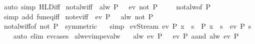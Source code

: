 \begin{isabellebody}
\isatagproof
{}\isamarkupfalse%
\ {\isacharparenleft}auto\ simp{\isacharcolon}\ HLD{\isacharunderscore}iff{\isacharparenright}%
\endisatagproof
{\isafoldproof}%
%
\isadelimproof
\isanewline
%
\endisadelimproof
\isanewline
{}\isamarkupfalse%
\ not{\isacharunderscore}alw{\isacharunderscore}iff{\isacharcolon}\ {\isachardoublequoteopen}{\isasymnot}\ {\isacharparenleft}alw\ P\ {\isasymomega}{\isacharparenright}\ {\isasymlongleftrightarrow}\ ev\ {\isacharparenleft}not\ P{\isacharparenright}\ {\isasymomega}{\isachardoublequoteclose}\isanewline
%
\isadelimproof
\ \ %
\endisadelimproof
%
\isatagproof
{}\isamarkupfalse%
\ not{\isacharunderscore}alw{\isacharbrackleft}of\ P{\isacharbrackright}\ \isamarkupfalse%
\ {\isacharparenleft}simp\ add{\isacharcolon}\ fun{\isacharunderscore}eq{\isacharunderscore}iff{\isacharparenright}%
\endisatagproof
{\isafoldproof}%
%
\isadelimproof
\isanewline
%
\endisadelimproof
\isanewline
{}\isamarkupfalse%
\ not{\isacharunderscore}ev{\isacharunderscore}iff{\isacharcolon}\ {\isachardoublequoteopen}{\isasymnot}\ {\isacharparenleft}ev\ P\ {\isasymomega}{\isacharparenright}\ {\isasymlongleftrightarrow}\ alw\ {\isacharparenleft}not\ P{\isacharparenright}\ {\isasymomega}{\isachardoublequoteclose}\isanewline
%
\isadelimproof
\ \ %
\endisadelimproof
%
\isatagproof
{}\isamarkupfalse%
\ not{\isacharunderscore}alw{\isacharunderscore}iff{\isacharbrackleft}of\ {\isachardoublequoteopen}not\ P{\isachardoublequoteclose}\ {\isasymomega}{\isacharcomma}\ symmetric{\isacharbrackright}\ \ \isamarkupfalse%
\ simp%
\endisatagproof
{\isafoldproof}%
%
\isadelimproof
\isanewline
%
\endisadelimproof
\isanewline
{}\isamarkupfalse%
\ ev{\isacharunderscore}Stream{\isacharcolon}\ {\isachardoublequoteopen}ev\ P\ {\isacharparenleft}x\ {\isacharhash}{\isacharhash}\ s{\isacharparenright}\ {\isasymlongleftrightarrow}\ P\ {\isacharparenleft}x\ {\isacharhash}{\isacharhash}\ s{\isacharparenright}\ {\isasymor}\ ev\ P\ s{\isachardoublequoteclose}\isanewline
%
\isadelimproof
\ \ %
\endisadelimproof
%
\isatagproof
{}\isamarkupfalse%
\ {\isacharparenleft}auto\ elim{\isacharcolon}\ ev{\isachardot}cases{\isacharparenright}%
\endisatagproof
{\isafoldproof}%
%
\isadelimproof
\isanewline
%
\endisadelimproof
\isanewline
{}\isamarkupfalse%
\ alw{\isacharunderscore}ev{\isacharunderscore}imp{\isacharunderscore}ev{\isacharunderscore}alw{\isacharcolon}\isanewline
\ \ \ {\isachardoublequoteopen}alw\ {\isacharparenleft}ev\ P{\isacharparenright}\ {\isasymomega}{\isachardoublequoteclose}\ \ {\isachardoublequoteopen}ev\ {\isacharparenleft}P\ aand\ alw\ {\isacharparenleft}ev\ P{\isacharparenright}{\isacharparenright}\ {\isasymomega}{\isachardoublequoteclose}\isanewline

\end{isabellebody}
